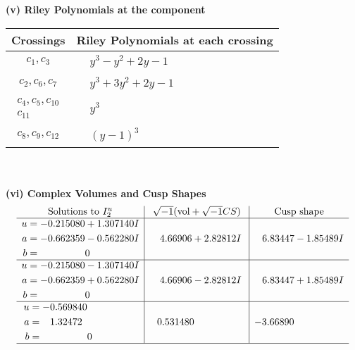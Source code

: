 \documentclass[1p]{elsarticle_modified}
\theoremstyle{definition}
\newcommand{\I}{\sqrt{-1}}
\begin{document}
\newpage\renewcommand{\arraystretch}{1}
\flushleft \textbf{(v) Riley Polynomials at the component}\newline \\
\begin{tabular}{m{50pt}|m{274pt}}
Crossings & \hspace{64pt}Riley Polynomials at each crossing \\
\hline $$\begin{aligned}c_{1},c_{3}\end{aligned}$$&$\begin{aligned}
&y^3- y^2+2 y-1
\end{aligned}$\\
\hline $$\begin{aligned}c_{2},c_{6},c_{7}\end{aligned}$$&$\begin{aligned}
&y^3+3 y^2+2 y-1
\end{aligned}$\\
\hline $$\begin{aligned}c_{4},c_{5},c_{10}\\c_{11}\end{aligned}$$&$\begin{aligned}
&y^3
\end{aligned}$\\
\hline $$\begin{aligned}c_{8},c_{9},c_{12}\end{aligned}$$&$\begin{aligned}
&(y-1)^3
\end{aligned}$\\
\hline
\end{tabular}\\~\\
\newpage\flushleft \textbf{(vi) Complex Volumes and Cusp Shapes}
$$\begin{array}{c|c|c}  
\text{Solutions to }I^u_{2}& \I (\text{vol} + \sqrt{-1}CS) & \text{Cusp shape}\\
 \hline 
\begin{aligned}
u &= -0.215080 + 1.307140 I \\
a &= -0.662359 - 0.562280 I \\
b &= \phantom{-0.000000 } 0\end{aligned}
 & \phantom{-}4.66906 + 2.82812 I & \phantom{-}6.83447 - 1.85489 I \\ \hline\begin{aligned}
u &= -0.215080 - 1.307140 I \\
a &= -0.662359 + 0.562280 I \\
b &= \phantom{-0.000000 } 0\end{aligned}
 & \phantom{-}4.66906 - 2.82812 I & \phantom{-}6.83447 + 1.85489 I \\ \hline\begin{aligned}
u &= -0.569840\phantom{ +0.000000I} \\
a &= \phantom{-}1.32472\phantom{ +0.000000I} \\
b &= \phantom{-0.000000 } 0\end{aligned}
 & \phantom{-}0.531480\phantom{ +0.000000I} & -3.66890\phantom{ +0.000000I}\\
 \hline 
 \end{array}$$\newpage\newpage\renewcommand{\arraystretch}{1}
\end{document}

